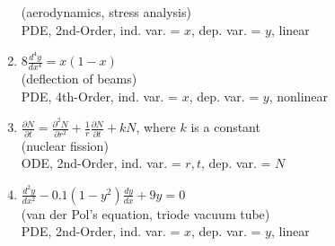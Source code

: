 \documentclass[12pt]{report}
\begin{document}
\begin{enumerate}
				(aerodynamics, stress analysis)\\
				PDE, 2nd-Order, ind. var. = $x$, dep. var. = $y$, linear
				\item $8\frac{d^4y}{dx^4}=x(1-x)$\\ %
				(deflection of beams)\\
				PDE, 4th-Order, ind. var. = $x$, dep. var. = $y$, nonlinear
				\item $\frac{\partial N}{\partial t}=\frac{\partial^2N}{\partial r^2}+\frac{1}{r}\frac{\partial N}{\partial t}+kN$, where $k$ is a constant\\ %
				(nuclear fission)\\
				ODE, 2nd-Order, ind. var. = $r,t$, dep. var. = $N$
				\item $\frac{d^2y}{dx^2}-0.1(1-y^2)\frac{dy}{dx}+9y=0$\\ %
				(van der Pol's equation, triode vacuum tube)\\
				PDE, 2nd-Order, ind. var. = $x$, dep. var. = $y$, linear\\\\
				

\end{enumerate}
\end{document}
